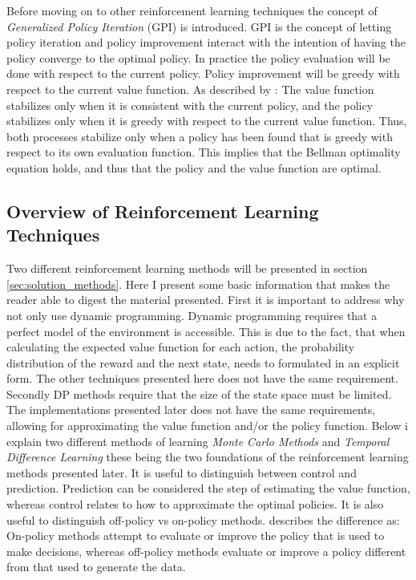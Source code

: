  Before moving on to other reinforcement learning techniques the concept of \textit{Generalized Policy Iteration} (GPI) is introduced. GPI is the concept of letting policy iteration and policy improvement interact with the intention of having the policy converge to the optimal policy. In practice the policy evaluation will be done with respect to the current policy. Policy improvement will be greedy with respect to the current value function. As described by \textcite{sutton_reinforcement_2018}: The value function stabilizes only when it is consistent with the current policy, and the policy stabilizes
only when it is greedy with respect to the current value function.
Thus, both processes stabilize only when a policy has been found that is greedy with respect to its own evaluation function. This implies that the Bellman optimality equation holds, and thus that the policy and the value function are optimal.
 
 \subsection{Overview of Reinforcement Learning Techniques}
 
Two different reinforcement learning methods will be presented in section \ref{sec:solution_methods}. Here I present some basic information that makes the reader able to digest the material presented. First it is important to address why not only use dynamic programming. Dynamic programming requires that a perfect model of the environment is accessible. This is due to the fact, that when calculating the expected value function for each action, the probability distribution of the reward and the next state, needs to formulated in an explicit form. The other techniques presented here does not have the same requirement. Secondly DP methods require that the size of the state space must be limited. The implementations presented later does not have the same requirements, allowing for approximating the value function and/or the policy function. Below i explain two different methods of learning \textit{Monte Carlo Methods} and \textit{Temporal Difference Learning} these being the two foundations of the reinforcement learning methods presented later. It is useful to distinguish between control and prediction. Prediction can be considered the step of estimating the value function, whereas control relates to how to approximate the optimal policies. It is also useful to distinguish off-policy vs on-policy methods. \parencite{sutton_reinforcement_2018} describes the difference as: On-policy methods attempt to evaluate or improve the policy that is used to make decisions, whereas off-policy methods evaluate or improve a policy different from that used to generate the data.

